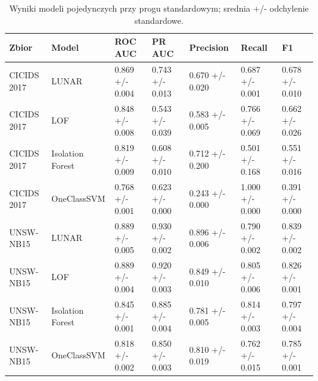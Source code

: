 \begin{table}
\caption{Wyniki modeli pojedynczych przy progu standardowym; srednia +/- odchylenie standardowe.}
\label{tab:solo_results}
\begin{tabular}{lllllll}
\toprule
Zbior & Model & ROC AUC & PR AUC & Precision & Recall & F1 \\
\midrule
CICIDS 2017 & LUNAR & 0.869 +/- 0.004 & 0.743 +/- 0.013 & 0.670 +/- 0.020 & 0.687 +/- 0.001 & 0.678 +/- 0.010 \\
CICIDS 2017 & LOF & 0.848 +/- 0.008 & 0.543 +/- 0.039 & 0.583 +/- 0.005 & 0.766 +/- 0.069 & 0.662 +/- 0.026 \\
CICIDS 2017 & Isolation Forest & 0.819 +/- 0.009 & 0.608 +/- 0.010 & 0.712 +/- 0.200 & 0.501 +/- 0.168 & 0.551 +/- 0.016 \\
CICIDS 2017 & OneClassSVM & 0.768 +/- 0.001 & 0.623 +/- 0.000 & 0.243 +/- 0.000 & 1.000 +/- 0.000 & 0.391 +/- 0.000 \\
UNSW-NB15 & LUNAR & 0.889 +/- 0.005 & 0.930 +/- 0.002 & 0.896 +/- 0.006 & 0.790 +/- 0.002 & 0.839 +/- 0.002 \\
UNSW-NB15 & LOF & 0.889 +/- 0.004 & 0.920 +/- 0.003 & 0.849 +/- 0.010 & 0.805 +/- 0.006 & 0.826 +/- 0.001 \\
UNSW-NB15 & Isolation Forest & 0.845 +/- 0.001 & 0.885 +/- 0.004 & 0.781 +/- 0.005 & 0.814 +/- 0.003 & 0.797 +/- 0.004 \\
UNSW-NB15 & OneClassSVM & 0.818 +/- 0.002 & 0.850 +/- 0.003 & 0.810 +/- 0.019 & 0.762 +/- 0.015 & 0.785 +/- 0.001 \\
\bottomrule
\end{tabular}
\end{table}
